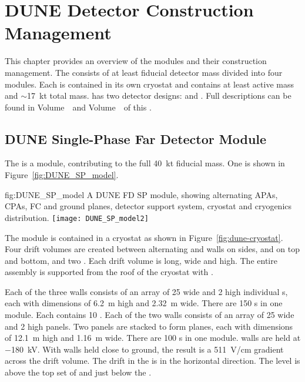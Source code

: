\chapter{DUNE Detector Construction Management}
\label{vl:tc-dune_overview}


This chapter provides an overview of
the   modules and their construction
management. The  consists of at least \fdfiducialmass  fiducial 
detector mass divided into four modules. Each  is contained in
its own cryostat and contains at least \nominalmodsize active mass and
$\sim$\SI{17}{\kilo\tonne} total mass.  has two detector designs:
 and .  Full descriptions can be found in
 Volume~\volnumbersp\ and Volume~\volnumberdp\
of this  .

\section{DUNE Single-Phase Far Detector Module}
\label{sec:fdsp-SP-module}

The   is a \nominalmodsize module,
contributing to the full \SI{40}{\kilo\tonne}  fiducial
mass.  One \nominalmodsize \dword{spmod} is shown in
Figure~\ref{fig:DUNE_SP_model}.
\begin{dunefigure}
{fig:DUNE_SP_model} 
{A \nominalmodsize DUNE FD SP module, showing alternating APAs,
    CPAs, FC and ground planes, detector support system, cryostat
    and cryogenics distribution.}
  \texttt{[image: DUNE\_SP\_model2]}
\end{dunefigure} 

The module is contained in a cryostat as shown in
Figure~\ref{fig:dune-cryostat}.  Four drift volumes are created
between alternating  and  walls on sides,
 and  on top and bottom, and two .
Each drift volume is \sptpclen long, \spmaxdrift wide and \tpcheight
high.  The entire assembly is supported from the roof of the cryostat
with \dword{dss}.

Each of the three  walls consists of an array of \num{25}
wide and \num{2} high individual s, each with dimensions of
\SI{6.2}{\meter} high and \SI{2.32}{\meter} wide. There are \num{150}
s in one module. Each \dword{apa} contains \num{10}
. Each of the two  walls consists of an array of
\num{25} wide and \num{2} high \dword{cpa} panels. Two panels are
stacked to form planes, each with dimensions of \SI{12.1}{\meter} high
and \SI{1.16}{\meter} wide. There are \num{100} s in one
module.  \dword{cpa} walls are held at $-$\SI{180}{\kilo\volt}. With
\dword{apa} walls held close to ground, the result is a
\SI{511}{\volt/\centi\meter} gradient across the drift volume. The
drift in the \dword{spmod} is in the horizontal direction. The
 level is above the top set of  and just below
the \dword{dss}.

